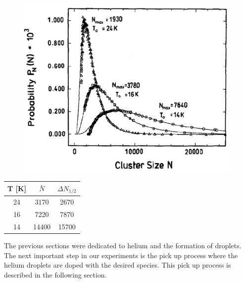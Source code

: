 \documentclass[parskip,12pt,headsepline,a4paper] {scrbook}
\begin{document}
\begin{figure}[ht]
\centerline{
\includegraphics[width=11cm]{./expansion/log-normal-distribution.jpg}}
\end{figure}

\begin{table}[h]
{}
\label{cluster-values}
\begin{center}
\begin{tabular}{c|c|c}

 T [K] & $\bar{N}$ & $\Delta N_{1/2}$ \\

\hline
\rowcolor{hellgrau}
24 & 3170 & 2670 \\
\rowcolor{dunkelgrau}
16 & 7220 & 7870  \\
\rowcolor{hellgrau}
14 & 14400 & 15700  \\
\end{tabular}
\end{center}
\end{table}

The previous sections were dedicated to helium and the formation of droplets. The next important step in our experiments is the pick up process where the helium droplets are doped with the desired species. This pick up process is described in the following section.
\end{document}
